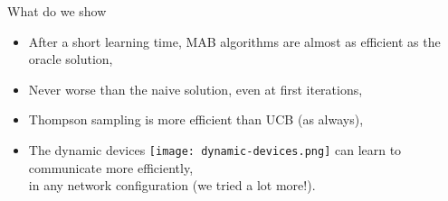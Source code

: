 \begin{frameO}

    \begin{colorblock}{What do we show}

        \begin{itemize}
            \setlength\itemsep{10pt}
            \item
                  After a short learning time, MAB algorithms are almost as efficient as
                  the oracle solution,
            \item
                  Never worse than the naive solution, even at first iterations,
            \item
                  Thompson sampling is more efficient than UCB
                  (as always),
            \item
                  The dynamic devices \texttt{[image: dynamic-devices.png]} can learn to communicate more efficiently,\\
                  in any network configuration (we tried a lot more!).
        \end{itemize}

    \end{colorblock}

\end{frameO}







